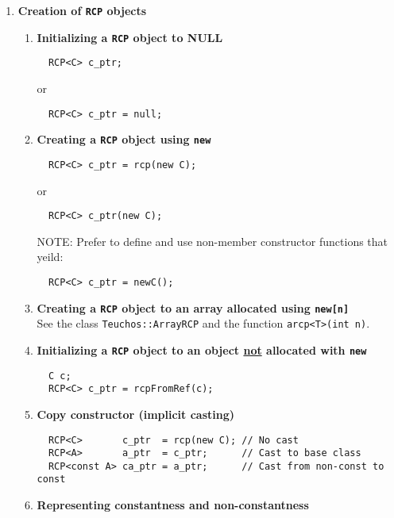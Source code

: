 \documentclass[pdf,ps2pdf,11pt]{SANDreport}
\begin{document}
\begin{enumerate}

\item {\bf Creation of \texttt{RCP} objects}

\begin{enumerate}

\item {\bf Initializing a \texttt{RCP} object to NULL}
\label{rcpqs:apdx:qs:null}
%
{\small\begin{verbatim}
  RCP<C> c_ptr;
\end{verbatim}}
or
{\small\begin{verbatim}
  RCP<C> c_ptr = null;
\end{verbatim}}

\item {\bf Creating a \texttt{RCP} object using \texttt{new}}
\label{rcpqs:apdx:qs:new}
%
{\small\begin{verbatim}
  RCP<C> c_ptr = rcp(new C);
\end{verbatim}}
or
{\small\begin{verbatim}
  RCP<C> c_ptr(new C);
\end{verbatim}}
NOTE: Prefer to define and use non-member constructor functions that
yeild:
{\small\begin{verbatim}
  RCP<C> c_ptr = newC();
\end{verbatim}}
%
\item {\bf Creating a \texttt{RCP} object to an array allocated using \texttt{new[n]}} \\
\label{rcpqs:apdx:qs:array-new}
%
See the class {}\texttt{Teuchos::ArrayRCP} and the function
{}\texttt{arcp<T>(int n)}.
%
\item {\bf Initializing a \texttt{RCP} object to an object
       \underline{not} allocated with \texttt{new}}
\label{rcpqs:apdx:qs:not-new}
%
{\small\begin{verbatim}
  C c;
  RCP<C> c_ptr = rcpFromRef(c);
\end{verbatim}}
%
\item {\bf Copy constructor (implicit casting)}
%
{\small\begin{verbatim}
  RCP<C>       c_ptr  = rcp(new C); // No cast
  RCP<A>       a_ptr  = c_ptr;      // Cast to base class
  RCP<const A> ca_ptr = a_ptr;      // Cast from non-const to const
\end{verbatim}}
%
\item {\bf Representing constantness and non-constantness}
%
\begin{enumerate}

\end{enumerate}
\end{enumerate}
\end{enumerate}
\end{document}
